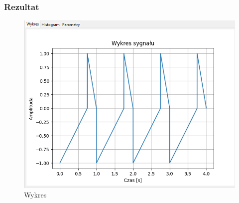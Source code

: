 \documentclass{article}
\begin{document}
\subsubsection{Rezultat}
\begin{figure}[h!]
    \centering
    \includegraphics[width=\textwidth]{img/sub/wykres.png}
    \caption{Wykres}
\end{figure}
\end{document}
